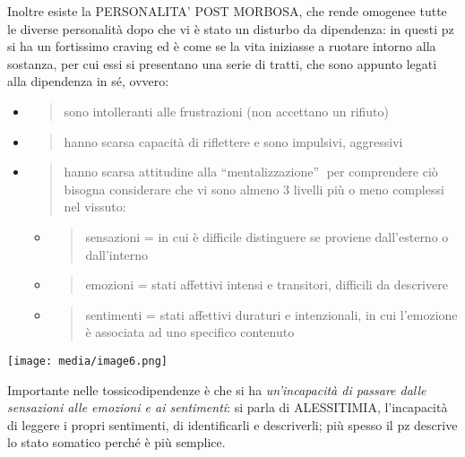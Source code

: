 \documentclass[]{article}
\begin{document}
Inoltre esiste la PERSONALITA' POST MORBOSA, che rende omogenee tutte le
diverse personalità dopo che vi è stato un disturbo da dipendenza: in
questi pz si ha un fortissimo craving ed è come se la vita iniziasse a
ruotare intorno alla sostanza, per cui essi si presentano una serie di
tratti, che sono appunto legati alla dipendenza in sé, ovvero:

\begin{itemize}
\item
  \begin{quote}
  sono intolleranti alle frustrazioni (non accettano un rifiuto)
  \end{quote}
\item
  \begin{quote}
  hanno scarsa capacità di riflettere e sono impulsivi, aggressivi
  \end{quote}
\item
  \begin{quote}
  hanno scarsa attitudine alla ``mentalizzazione'' per comprendere ciò
  bisogna considerare che vi sono almeno 3 livelli più o meno complessi
  nel vissuto:
  \end{quote}

  \begin{itemize}
  \item
    \begin{quote}
    sensazioni = in cui è difficile distinguere se proviene dall'esterno
    o dall'interno
    \end{quote}
  \item
    \begin{quote}
    emozioni = stati affettivi intensi e transitori, difficili da
    descrivere
    \end{quote}
  \item
    \begin{quote}
    sentimenti = stati affettivi duraturi e intenzionali, in cui
    l'emozione è associata ad uno specifico contenuto
    \end{quote}
  \end{itemize}
\end{itemize}

\texttt{[image: media/image6.png]}

Importante nelle tossicodipendenze è che si ha \emph{un'incapacità di
passare dalle sensazioni alle emozioni e ai sentimenti}: si parla di
ALESSITIMIA, l'incapacità di leggere i propri sentimenti, di
identificarli e descriverli; più spesso il pz descrive lo stato somatico
perché è più semplice.
\end{document}

